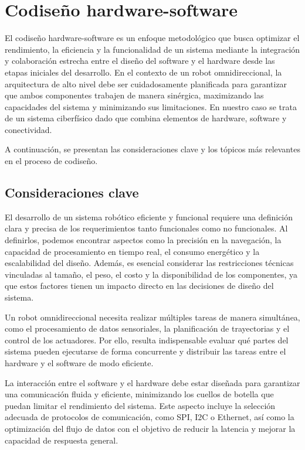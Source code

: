 \section{Codiseño hardware-software}

El codiseño hardware-software es un enfoque metodológico que busca optimizar el rendimiento, la eficiencia y la funcionalidad de un sistema mediante la integración y colaboración estrecha entre el diseño del software y el hardware desde las etapas iniciales del desarrollo. En el contexto de un robot omnidireccional, la arquitectura de alto nivel debe ser cuidadosamente planificada para garantizar que ambos componentes trabajen de manera sinérgica, maximizando las capacidades del sistema y minimizando sus limitaciones. En nuestro caso se trata de un sistema ciberfísico dado que combina elementos de hardware, software y conectividad. \cite{lee2017introduction}

A continuación, se presentan las consideraciones clave y los tópicos más relevantes en el proceso de codiseño.

\subsection{Consideraciones clave}
El desarrollo de un sistema robótico eficiente y funcional requiere una definición clara y precisa de los requerimientos tanto funcionales como no funcionales. Al definirlos, podemos encontrar aspectos como la precisión en la navegación, la capacidad de procesamiento en tiempo real, el consumo energético y la escalabilidad del diseño. Además, es esencial considerar las restricciones técnicas vinculadas al tamaño, el peso, el costo y la disponibilidad de los componentes, ya que estos factores tienen un impacto directo en las decisiones de diseño del sistema.

Un robot omnidireccional necesita realizar múltiples tareas de manera simultánea, como el procesamiento de datos sensoriales, la planificación de trayectorias y el control de los actuadores. Por ello, resulta indispensable evaluar qué partes del sistema pueden ejecutarse de forma concurrente y distribuir las tareas entre el hardware y el software de modo eficiente.

La interacción entre el software y el hardware debe estar diseñada para garantizar una comunicación fluida y eficiente, minimizando los cuellos de botella que puedan limitar el rendimiento del sistema. Este aspecto incluye la selección adecuada de protocolos de comunicación, como SPI, I2C o Ethernet, así como la optimización del flujo de datos con el objetivo de reducir la latencia y mejorar la capacidad de respuesta general. \cite{lee2017introduction}

